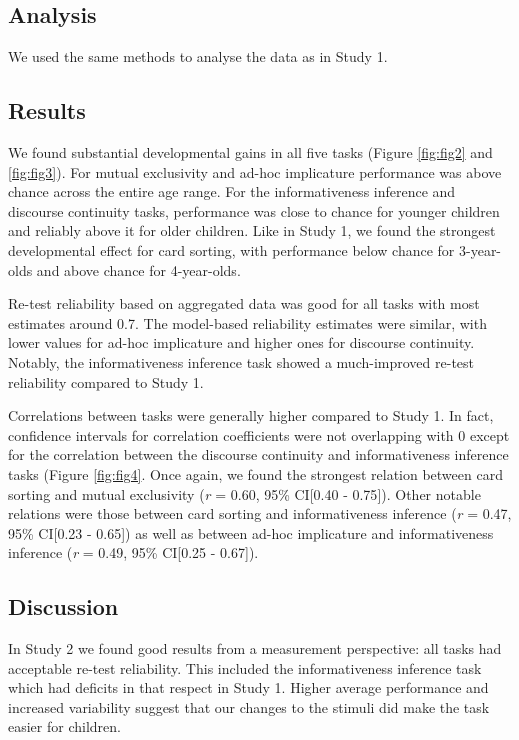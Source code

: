 \documentclass[
  english,
  man,floatsintext]{apa6}
\begin{document}
\hypertarget{analysis-1}{%
\subsection{Analysis}\label{analysis-1}}

We used the same methods to analyse the data as in Study 1.

\hypertarget{results-1}{%
\subsection{Results}\label{results-1}}

We found substantial developmental gains in all five tasks (Figure \ref{fig:fig2} and \ref{fig:fig3}). For mutual exclusivity and ad-hoc implicature performance was above chance across the entire age range. For the informativeness inference and discourse continuity tasks, performance was close to chance for younger children and reliably above it for older children. Like in Study 1, we found the strongest developmental effect for card sorting, with performance below chance for 3-year-olds and above chance for 4-year-olds.

Re-test reliability based on aggregated data was good for all tasks with most estimates around 0.7. The model-based reliability estimates were similar, with lower values for ad-hoc implicature and higher ones for discourse continuity. Notably, the informativeness inference task showed a much-improved re-test reliability compared to Study 1.

Correlations between tasks were generally higher compared to Study 1. In fact, confidence intervals for correlation coefficients were not overlapping with 0 except for the correlation between the discourse continuity and informativeness inference tasks (Figure \ref{fig:fig4}. Once again, we found the strongest relation between card sorting and mutual exclusivity (\emph{r} = 0.60, 95\% CI{[}0.40 - 0.75{]}). Other notable relations were those between card sorting and informativeness inference (\emph{r} = 0.47, 95\% CI{[}0.23 - 0.65{]}) as well as between ad-hoc implicature and informativeness inference (\emph{r} = 0.49, 95\% CI{[}0.25 - 0.67{]}).

\hypertarget{discussion-1}{%
\subsection{Discussion}\label{discussion-1}}

In Study 2 we found good results from a measurement perspective: all tasks had acceptable re-test reliability. This included the informativeness inference task which had deficits in that respect in Study 1. Higher average performance and increased variability suggest that our changes to the stimuli did make the task easier for children.
\end{document}
